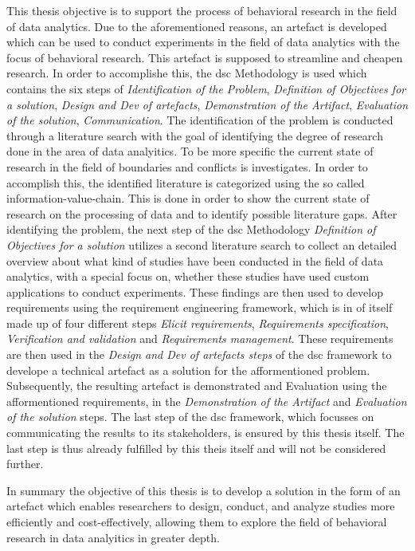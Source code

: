 This thesis objective is to support the process of behavioral research in the field of data analytics. Due to the aforementioned reasons, an artefact is developed which can be used to conduct experiments in the field of data analytics with the focus of behavioral research. This artefact is supposed to streamline and cheapen research. In order to accomplishe this, the \ac{dsc} Methodology is used which contains the six steps of \textit{Identification of the Problem}, \textit{Definition of Objectives for a solution}, \textit{Design and Dev of artefacts}, \textit{Demonstration of the Artifact}, \textit{Evaluation of the solution}, \textit{Communication}. The identification of the problem is conducted through a literature search with the goal of identifying the degree of research done in the area of data analyitics. To be more specific the current state of research in the field of boundaries and conflicts is investigates. In order to accomplish this, the identified literature is categorized using the so called information-value-chain. This is done in order to show the current state of research on the processing of data and to identify possible literature gaps. After identifying the problem, the next step of the \ac{dsc} Methodology \textit{Definition of Objectives for a solution} utilizes a second literature search to collect an detailed overview about what kind of studies have been conducted in the field of data analytics, with a special focus on, whether these studies have used custom applications to conduct experiments. These findings are then used to develop requirements using the requirement engineering framework, which is in of itself made up of four different steps \textit{Elicit requirements}, \textit{Requirements specification}, \textit{Verification and validation} and \textit{Requirements management}. These requirements are then used in the \textit{Design and Dev of artefacts steps} of the \ac{dsc} framework to develope a technical artefact as a solution for the afformentioned problem. Subsequently, the resulting artefact is demonstrated and Evaluation using the afformentioned requirements, in the \textit{Demonstration of the Artifact} and \textit{Evaluation of the solution} steps. The last step of the \ac{dsc} framework, which focusses on communicating the results to its stakeholders, is ensured by this thesis itself. The last step is thus already fulfilled by this theis itself and will not be considered further.

In summary the objective of this thesis is to develop a solution in the form of an artefact which enables researchers to design, conduct, and analyze studies more efficiently and cost-effectively, allowing them to explore the field of behavioral research in data analyitics in greater depth.
    




